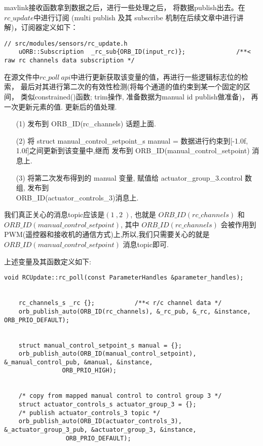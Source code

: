 mavlink接收函数拿到数据之后，进行一些处理之后， 将数据publish出去。在$rc\_update$中进行订阅
(multi publish 及其 subscribe 机制在后续文章中进行讲解)，订阅器定义如下：
\begin{lstlisting}[title=订阅器的声明定义]
    // src/modules/sensors/rc_update.h
    uORB::Subscription	_rc_sub{ORB_ID(input_rc)};				/**< raw rc channels data subscription */
\end{lstlisting}

在源文件中$rc\_poll\ api$中进行更新获取该变量的值，再进行一些逻辑标志位的检索，
最后对其进行第二次的有效性检测(将每个通道的值约束到某一个固定的区间， 类似constrained()函数; trim操作, 
准备数据为manual id publish做准备)， 再一次更新元素的值. 更新后的值处理.
\begin{itemize}
    \item [(1)] 发布到 ORB\_ID(rc\_channels) 话题上面.
    \item [(2)] 将 struct manual\_control\_setpoint\_s manual = {} 数据进行约束到[-1.0f, 1.0f]之间更新到该变量中,继而 发布到 ORB\_ID(manual\_control\_setpoint) 消息上.
    \item [(3)] 将第二次发布得到的 manual 变量, 赋值给 actuator\_group\_3.control 数组, 发布到\\ ORB\_ID(actuator\_controls\_3)消息上.
\end{itemize}

我们真正关心的消息topic应该是$(1\>, 2\>)$, 也就是 $ORB\_ID(rc\_channels)$ 和 $ORB\_ID(manual\_control\_setpoint)$, 
其中 $ORB\_ID(rc\_channels)$ 会被作用到PWM(遥控器和接收机的通信方式)上,所以,我们只需要关心的就是\\ $ORB\_ID(manual\_control\_setpoint)$ 消息topic即可.
\par
上述变量及其函数定义如下:
\begin{lstlisting}[title=上述变量及其函数定义]
    void RCUpdate::rc_poll(const ParameterHandles &parameter_handles);


    rc_channels_s _rc {};			/**< r/c channel data */
    orb_publish_auto(ORB_ID(rc_channels), &_rc_pub, &_rc, &instance, ORB_PRIO_DEFAULT);
    
    
    struct manual_control_setpoint_s manual = {};
    orb_publish_auto(ORB_ID(manual_control_setpoint), &_manual_control_pub, &manual, &instance,
                ORB_PRIO_HIGH);
    
    
    /* copy from mapped manual control to control group 3 */
    struct actuator_controls_s actuator_group_3 = {};
    /* publish actuator_controls_3 topic */
    orb_publish_auto(ORB_ID(actuator_controls_3), &_actuator_group_3_pub, &actuator_group_3, &instance,
                 ORB_PRIO_DEFAULT);
\end{lstlisting}

